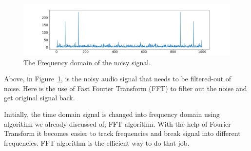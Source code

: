 \documentclass[a4paper, 12pt]{scrartcl}
\begin{document}
\begin{figure}[H] 
  \centering
  \includegraphics[width=\textwidth]{img/time_to_freq.png}
  \caption{The Frequency domain of the noisy signal.}
  \label{fig:time_to_freq}
\end{figure}

Above, in Figure~\ref{fig:time_to_freq}, is the noisy audio signal that needs to be filtered-out of noise.
Here is the use of Fast Fourier Transform (FFT) to filter out the noise and get original signal back.

Initially, the time domain signal is changed into frequency domain using algorithm we already discussed of; FFT algorithm.
With the help of Fourier Transform it becomes easier to track frequencies and break signal into different frequencies.
FFT algorithm is the efficient way to do that job.

\newpage


  
\end{document}
